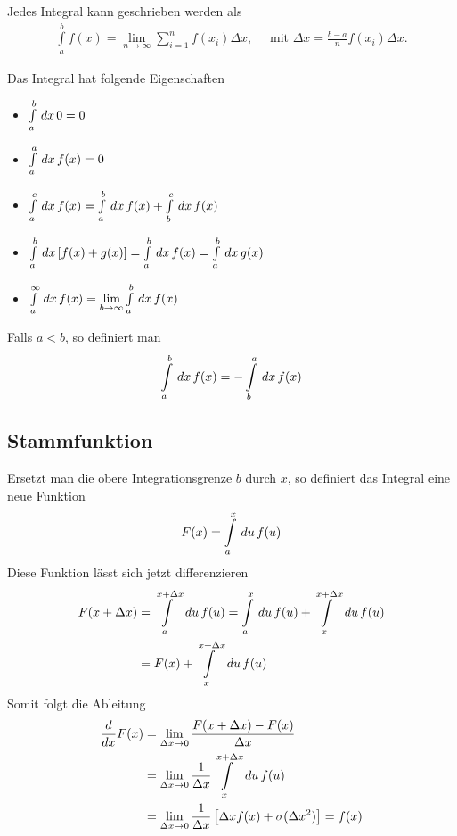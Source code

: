 \begin{Bemerkung}
Jedes Integral kann geschrieben werden als
\begin{align}
\int \limits_{a}^{b} f(x) = \lim \limits_{n\to \infty} \sum \limits_{i = 1}^{n}
f(x_i)\Delta x,\quad \text{ mit } \Delta x = \frac{b-a}{n} f(x_i)\Delta x.
\end{align}
\end{Bemerkung}
Das Integral hat folgende Eigenschaften
\begin{itemize}
 \item $\int \limits_{a}^{b} \,dx\, 0 = 0$
 \item $\int \limits_{a}^{a} \,dx\, f(x) = 0$
 \item $\int \limits_{a}^{c} \,dx\, f(x) = \int \limits_{a}^{b} \,dx\, f(x) + \int \limits_{b}^{c} \,dx\, f(x)$
 \item $\int \limits_{a}^{b} \,dx\, [f(x) + g(x)] = \int \limits_{a}^{b} \,dx\, f(x) = \int \limits_{a}^{b} \,dx\, g(x)$
 \item $\int \limits_{a}^{\infty} \,dx\, f(x) = \lim \limits_{b\to\infty} \int \limits_{a}^{b} \,dx\, f(x)$
\end{itemize}
Falls $a < b$, so definiert man
\begin{align}
 \int \limits_{a}^{b} \,dx\, f(x) = -\int \limits_{b}^{a} \,dx\, f(x)
\end{align}


\subsection{Stammfunktion}
Ersetzt man die obere Integrationsgrenze $b$ durch $x$, so definiert das Integral eine neue Funktion
\begin{equation}
 F(x) = \int \limits_{a}^{x} \,du\, f(u)
\end{equation}
Diese Funktion lässt sich jetzt differenzieren
\begin{align*}
 F(x+\Delta x) &= \int \limits_{a}^{x+\Delta x} \,du\, f(u) = \int \limits_{a}^{x}
 \,du\, f(u) + \int \limits_{x}^{x+\Delta x} \,du\, f(u) \\ &= F(x) + \int
 \limits_{x}^{x+\Delta x} \,du\, f(u)
\end{align*}
Somit folgt die Ableitung
\begin{align*}
 \frac{d}{dx}F(x) &= \lim \limits_{\Delta x \to 0} \frac{F(x + \Delta x) - F(x)}{\Delta x}\\
 &= \lim \limits_{\Delta x \to 0} \frac{1}{\Delta x} \int
\limits_{x}^{x+\Delta x} \,du\, f(u)\\
 &= \lim \limits_{\Delta x \to 0} \frac{1}{\Delta x} \left[ \Delta x f(x) + \sigma(\Delta x^2)\right] = f(x)
\end{align*}

